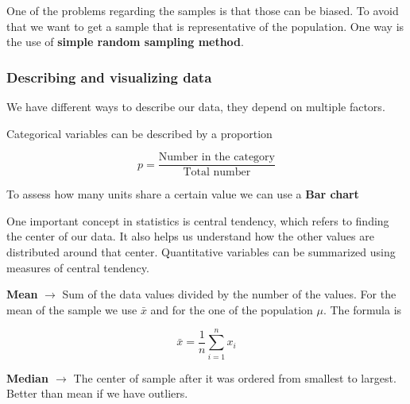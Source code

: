 One of the problems regarding the samples is that those can be biased. To avoid that we want to get a sample that is representative of the population. One way is the use of \textbf{simple random sampling method}.

\subsubsection{Describing and visualizing data}

We have different ways to describe our data, they depend on multiple factors.

Categorical variables can be described by a proportion



\[
p = \frac{\text{Number in the category}}{\text{Total number}}
\]

To assess how many units share a certain value we can use a \textbf{Bar chart}


\vspace{10pt}

One important concept in statistics is central tendency, which refers to finding the center of our data. It also helps us understand how the other values are distributed around that center. Quantitative variables can be summarized using measures of central tendency.

\vspace{10pt}

\textbf{Mean} $\xrightarrow{}$ Sum of the data values divided by the number of the values. For the mean of the sample we use $\bar{x}$ and for the one of the population $\mu$. The formula is

\[
\bar{x} = \frac{1}{n} \sum_{i=1}^n x_i
\]

\vspace{10pt}

\textbf{Median $\xrightarrow{}$} The center of sample after it was ordered from smallest to largest. Better than mean if we have outliers.

